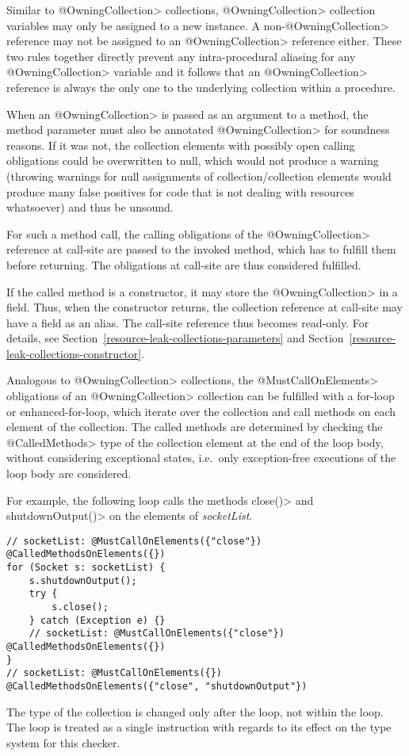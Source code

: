 Similar to \<@OwningCollection> collections, \<@OwningCollection> collection variables may only be assigned to a new instance. A non-\<@OwningCollection> reference may not be assigned to an \<@OwningCollection> reference either. These two rules together directly prevent any intra-procedural aliasing for any \<@OwningCollection> variable and it follows that an \<@OwningCollection> reference is always the only one to the underlying collection within a procedure.

When an \<@OwningCollection> is passed as an argument to a method, the method parameter must also be annotated \<@OwningCollection> for soundness reasons. If it was not, the collection elements with possibly open calling obligations could be overwritten to null, which would not produce a warning (throwing warnings for null assignments of collection/collection elements would produce many false positives for code that is not dealing with resources whatsoever) and thus be unsound.

For such a method call, the calling obligations of the \<@OwningCollection> reference at call-site are passed to the invoked method, which has to fulfill them before returning. The obligations at call-site are thus considered fulfilled.

If the called method is a constructor, it may store the \<@OwningCollection> in a field. Thus, when the constructor returns, the collection reference at call-site may have a field as an alias. The call-site reference thus becomes read-only. For details, see Section~\ref{resource-leak-collections-parameters} and Section~\ref{resource-leak-collections-constructor}.

Analogous to \<@OwningCollection> collections, the \<@MustCallOnElements> obligations of an \<@OwningCollection> collection can be fulfilled with a for-loop or enhanced-for-loop, which iterate over the collection and call methods on each element of the collection. The called methods are determined by checking the \<@CalledMethods> type of the collection element at the end of the loop body, without considering exceptional states, i.e.\ only exception-free executions of the loop body are considered.

For example, the following loop calls the methods \<close()> and \<shutdownOutput()> on the elements of \textit{socketList}.
\begin{verbatim}
// socketList: @MustCallOnElements({"close"}) @CalledMethodsOnElements({})
for (Socket s: socketList) {
    s.shutdownOutput();
    try {
        s.close();
    } catch (Exception e) {}
    // socketList: @MustCallOnElements({"close"}) @CalledMethodsOnElements({})
}
// socketList: @MustCallOnElements({}) @CalledMethodsOnElements({"close", "shutdownOutput"})
\end{verbatim}
The type of the collection is changed only after the loop, not within the loop. The loop is treated as a single instruction with regards to its effect on the type system for this checker.

